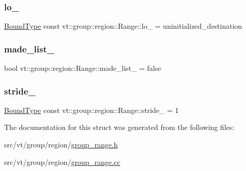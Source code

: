 \subsubsection{\texorpdfstring{lo\+\_\+}{lo\_}}
{\footnotesize\ttfamily \hyperlink{structvt_1_1group_1_1region_1_1_region_abf426ff85bed72c1c6524fad6a9f1751}{Bound\+Type} const vt\+::group\+::region\+::\+Range\+::lo\+\_\+ = uninitialized\+\_\+destination\hspace{0.3cm}{\ttfamily [private]}}

\mbox{\label{structvt_1_1group_1_1region_1_1_range_aa0193a445bff44cfb5c27864d485ce97}} 
\subsubsection{\texorpdfstring{made\+\_\+list\+\_\+}{made\_list\_}}
{\footnotesize\ttfamily bool vt\+::group\+::region\+::\+Range\+::made\+\_\+list\+\_\+ = false\hspace{0.3cm}{\ttfamily [private]}}

\mbox{\label{structvt_1_1group_1_1region_1_1_range_ad483fd4ac3bb38c69501fd95cef3890c}} 
\subsubsection{\texorpdfstring{stride\+\_\+}{stride\_}}
{\footnotesize\ttfamily \hyperlink{structvt_1_1group_1_1region_1_1_region_abf426ff85bed72c1c6524fad6a9f1751}{Bound\+Type} const vt\+::group\+::region\+::\+Range\+::stride\+\_\+ = 1\hspace{0.3cm}{\ttfamily [private]}}



The documentation for this struct was generated from the following files\+:\begin{DoxyCompactItemize}
\item 
src/vt/group/region/\hyperlink{group__range_8h}{group\+\_\+range.\+h}\item 
src/vt/group/region/\hyperlink{group__range_8cc}{group\+\_\+range.\+cc}\end{DoxyCompactItemize}
